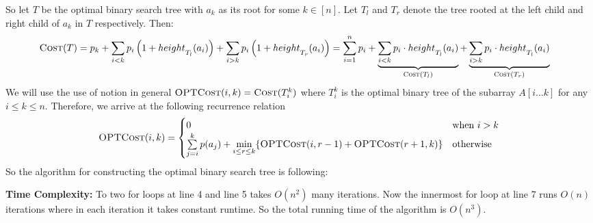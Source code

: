 So let $T$ be the optimal binary search tree with $a_k$ as its root for some $k\in[n]$. Let $T_l$ and $T_r$ denote the tree rooted at the left child and right child of $a_k$ in $T$ respectively. Then: \begin{align*}
	\textsc{Cost}(T) & = p_k+ {\sum_{i<k}p_i\left(1+height\strut_{T_l}(a_i)\right)}+{\sum_{i>k}p_i\left(1+height\strut_{T_r}(a_i)\right)} = \sum_{i=1}^n p_i+\underbrace{\sum_{i<k}p_i \cdot height\strut_{T_l}(a_i)}_{\textsc{Cost}(T_l)}+\underbrace{\sum_{i>k}p_i \cdot height\strut_{T_l}(a_i)}_{\textsc{Cost}(T_r)}
\end{align*}
We will use the use of notion  in general $\textsc{OPTCost}(i,k)=\textsc{Cost}(T_i^k)$ where $T_i^k$ is the optimal binary tree of the subarray $A[i\dots k]$ for any $i\leq k\leq n$.  Therefore, we arrive at the following recurrence relation $$\textsc{OPTCost}(i,k)=\begin{cases}
	0&\text{when $i>k$}\\
	\sum\limits_{j=i}^k p(a_j)+\min\limits_{i\leq r\leq k}\{\textsc{OPTCost}(i,r-1)+\textsc{OPTCost}(r+1,k)\} & \text{otherwise}
\end{cases}$$
So the algorithm for constructing the optimal binary search tree is following:
\begin{algorithm}
\DontPrintSemicolon
\caption{$(A,P)$}
\end{algorithm}\parinf

\textbf{Time Complexity:} To two for loops at line 4 and line 5 takes $O(n^2)$ many iterations. Now the innermost for loop at line 7 runs $O(n)$ iterations where in each iteration it takes constant runtime. So the total running time of the algorithm is $O(n^3)$.